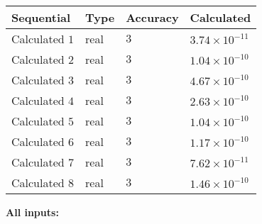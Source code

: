 \documentclass[12pt]{article}
\begin{document}
   
   
   
\noindent{}
   
   
  
  
\noindent\begin{tabular}{|l|l|l|l|}
\hline
 Sequential & Type & Accuracy & Calculated \\ 
\hline
 
 
  Calculated $            1 $ & real & $            3  $ & 
 $ 3.74 \times 10^{-11} $ 
 \\  \hline  
 
 
  Calculated $            2 $ & real & $            3  $ & 
 $ 1.04 \times 10^{-10} $ 
 \\  \hline  
 
 
  Calculated $            3 $ & real & $            3  $ & 
 $ 4.67 \times 10^{-10} $ 
 \\  \hline  
 
 
  Calculated $            4 $ & real & $            3  $ & 
 $ 2.63 \times 10^{-10} $ 
 \\  \hline  
 
 
  Calculated $            5 $ & real & $            3  $ & 
 $ 1.04 \times 10^{-10} $ 
 \\  \hline  
 
 
  Calculated $            6 $ & real & $            3  $ & 
 $ 1.17 \times 10^{-10} $ 
 \\  \hline  
 
 
  Calculated $            7 $ & real & $            3  $ & 
 $ 7.62 \times 10^{-11} $ 
 \\  \hline  
 
 
  Calculated $            8 $ & real & $            3  $ & 
 $ 1.46 \times 10^{-10} $ 
 \\  \hline  
 \end{tabular}
   
   
   
   
\noindent\vspace{0.1in}\hspace{-0.08in} {\textbf{\Large{All inputs: }}}
   
   
  
\end{document}
